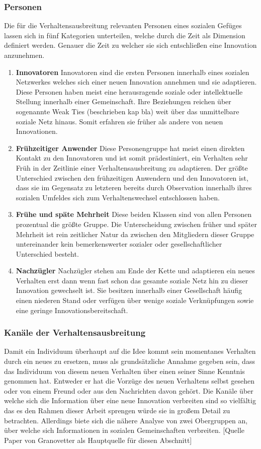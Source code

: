 \documentclass[12pt]{article}
\begin{document}
\subsubsection{Personen}
Die für die Verhaltensausbreitung relevanten Personen eines sozialen Gefüges lassen sich in fünf Kategorien unterteilen, welche durch die Zeit als Dimension definiert werden. Genauer die Zeit zu welcher sie sich entschließen eine Innovation anzunehmen.
\begin{enumerate}
\item \textbf{Innovatoren} Innovatoren sind die ersten Personen innerhalb eines sozialen Netzwerkes welches sich einer neuen Innovation annehmen und sie adaptieren. Diese Personen haben meist eine herausragende soziale oder intellektuelle Stellung innerhalb einer Gemeinschaft. Ihre Beziehungen reichen über sogenannte Weak Ties (beschrieben kap bla) weit über das unmittelbare soziale Netz hinaus. Somit erfahren sie früher als andere von neuen Innovationen.
\item \textbf{Frühzeitiger Anwender} Diese Personengruppe hat meist einen direkten Kontakt zu den Innovatoren und ist somit prädestiniert, ein Verhalten sehr Früh in der Zeitlinie einer Verhaltensausbreitung zu adaptieren. Der größte Unterschied zwischen den frühzeitigen Anwendern und den Innovatoren ist, dass sie im Gegensatz zu letzteren bereits durch Observation innerhalb ihres sozialen Umfeldes sich zum Verhaltenswechsel entschlossen haben.
\item \textbf{Frühe und späte Mehrheit} Diese beiden Klassen sind von allen Personen prozentual die größte Gruppe. Die Unterscheidung zwischen früher und später Mehrheit ist rein zeitlicher Natur da zwischen den Mitgliedern dieser Gruppe untereinander kein bemerkenswerter sozialer oder gesellschaftlicher Unterschied besteht.
\item \textbf{Nachzügler} Nachzügler stehen am Ende der Kette und adaptieren ein neues Verhalten erst dann wenn fast schon das gesamte soziale Netz hin zu dieser Innovation gewechselt ist. Sie besitzen innerhalb einer Gesellschaft häufig einen niederen Stand oder verfügen über wenige soziale Verknüpfungen sowie eine geringe Innovationsbereitschaft.
\end{enumerate}
\subsubsection{Kanäle der Verhaltensausbreitung}
Damit ein Individuum überhaupt auf die Idee kommt sein momentanes Verhalten durch ein neues zu ersetzen, muss als grundsätzliche Annahme gegeben sein, dass das Individuum von diesem neuen Verhalten über einen seiner Sinne Kenntnis genommen hat. Entweder er hat die Vorzüge des neuen Verhaltens selbst gesehen oder von einem Freund oder aus den Nachrichten davon gehört. Die Kanäle über welche sich die Information über eine neue Innovation verbreiten sind so vielfältig das es den Rahmen dieser Arbeit sprengen würde sie in großem Detail zu betrachten. Allerdings biete sich die nähere Analyse von zwei Obergruppen an, über welche sich Informationen in sozialen Gemeinschaften verbreiten.
[Quelle Paper von Granovetter als Hauptquelle für diesen Abschnitt]
\end{document}
